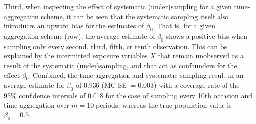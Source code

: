 \documentclass[man]{apa7} %
\begin{document}
Third, when inspecting the effect of systematic (under)sampling for a given time-aggregation scheme, it can be seen that the systematic sampling itself also introduces an upward bias for the estimates of $\beta_{0}$. That is, for a given aggregation scheme (row), the average estimate of $\beta_{0}$ shows a positive bias when sampling only every second, third, fifth, or tenth observation. This can be explained by the intermitted exposure variables $X$ that remain unobserved as a result of the systematic (under)sampling, and that act as confounders for the effect $\beta_{0}$. Combined, the time-aggregation and systematic sampling result in an average estimate for $\beta_{0}$ of $0.936$ (MC-SE $= 0.003$) with a coverage rate of the 95\% confidence intervals of 0.018 for the case of sampling every 10th occasion and time-aggregation over $m = 10$ periods, whereas the true population value is $\beta_{0} = 0.5$. 
\end{document}
